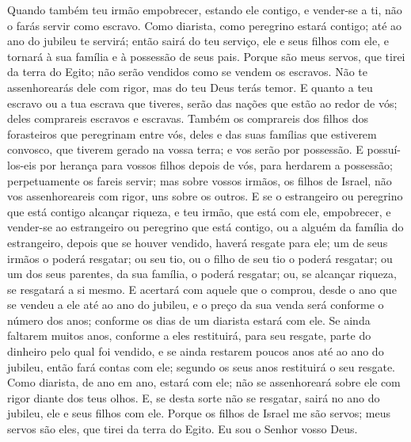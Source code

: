 Quando também teu irmão empobrecer, estando ele contigo, e
vender-se a ti, não o farás servir como escravo. Como
diarista, como peregrino estará contigo; até ao ano do jubileu te
servirá; então sairá do teu serviço, ele e seus filhos com
ele, e tornará à sua família e à possessão de seus pais.
Porque são meus servos, que tirei da terra do Egito; não
serão vendidos como se vendem os escravos. Não te
assenhorearás dele com rigor, mas do teu Deus terás temor. E
quanto a teu escravo ou a tua escrava que tiveres, serão das nações
que estão ao redor de vós; deles comprareis escravos e escravas.
Também os comprareis dos filhos dos forasteiros que
peregrinam entre vós, deles e das suas famílias que estiverem
convosco, que tiverem gerado na vossa terra; e vos serão por
possessão. E possuí-los-eis por herança para vossos filhos
depois de vós, para herdarem a possessão; perpetuamente os fareis
servir; mas sobre vossos irmãos, os filhos de Israel, não vos
assenhoreareis com rigor, uns sobre os outros. E se o
estrangeiro ou peregrino que está contigo alcançar riqueza, e teu
irmão, que está com ele, empobrecer, e vender-se ao estrangeiro ou
peregrino que está contigo, ou a alguém da família do estrangeiro,
depois que se houver vendido, haverá resgate para ele; um de
seus irmãos o poderá resgatar; ou seu tio, ou o filho de seu
tio o poderá resgatar; ou um dos seus parentes, da sua família, o
poderá resgatar; ou, se alcançar riqueza, se resgatará a si mesmo.
E acertará com aquele que o comprou, desde o ano que se
vendeu a ele até ao ano do jubileu, e o preço da sua venda será
conforme o número dos anos; conforme os dias de um diarista estará
com ele. Se ainda faltarem muitos anos, conforme a eles
restituirá, para seu resgate, parte do dinheiro pelo qual foi
vendido, e se ainda restarem poucos anos até ao ano do
jubileu, então fará contas com ele; segundo os seus anos restituirá
o seu resgate. Como diarista, de ano em ano, estará com ele;
não se assenhoreará sobre ele com rigor diante dos teus olhos.
E, se desta sorte não se resgatar, sairá no ano do jubileu,
ele e seus filhos com ele. Porque os filhos de Israel me são
servos; meus servos são eles, que tirei da terra do Egito. Eu sou o
Senhor vosso Deus.


\medskip

